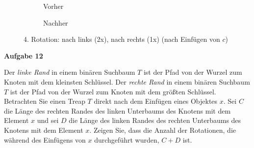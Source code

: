 \documentclass{article}
\begin{document}
\begin{figure}[H]
  \centering
  \begin{subfigure}[b]{.45\textwidth}
    \centering
    \label{subfig:aufg9-i-1-before}
    \caption{Vorher}
  \end{subfigure}
  \quad
  \begin{subfigure}[b]{.45\textwidth}
    \centering
    \label{subfig:aufg9-i-1-after}
    \caption{Nachher}
  \end{subfigure}
  \label{fig:aufg9-i-1}
  \caption{4. Rotation: nach links (2x), nach rechts (1x) (nach Einf{\"u}gen von $c$)}
\end{figure}

{\bfseries Aufgabe 12}%

Der {\it linke Rand} in einem bin{\"a}ren Suchbaum $T$ ist der Pfad von der Wurzel
zum Knoten mit dem kleinsten Schl{\"u}ssel. Der {\it rechte Rand} in einem
bin{\"a}ren Suchbaum $T$ ist der Pfad von der Wurzel zum Knoten mit dem
gr{\"o}{\ss}ten Schl{\"u}ssel. Betrachten Sie einen Treap $T$ direkt nach dem
Einf{\"u}gen eines Objektes $x$. Sei $C$ die L{\"a}nge des rechten Randes des
linken Unterbaums des Knotens mit dem Element $x$ und sei $D$ die L{\"a}nge des
linken Randes des rechten Unterbaums des Knotens mit dem Element $x$. Zeigen Sie,
dass die Anzahl der Rotationen, die w{\"a}hrend des Einf{\"u}gens von $x$
durchgef{\"u}hrt wurden, $C + D$ ist.
\end{document}
